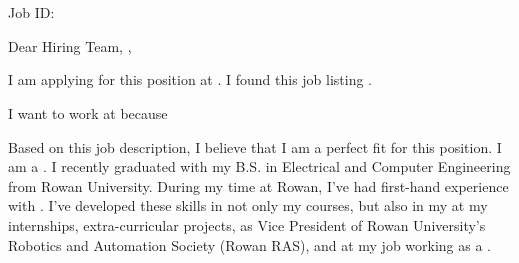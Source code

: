 \documentclass[11pt]{letter} %
\begin{document}
\begin{letter}
    {\companyaddress
    {\ifdefempty{\jobid} {} {\\~\\Job ID: \jobid}}
    }


\opening{
  Dear
\ifdefempty{\companyhiringmanager}
{Hiring Team,}
{\companyhiringmanager,}
}

I am applying for this {\jobterm} {\jobtitle} position at {\company}. I found
    this job listing {\joblisting}.

    I want to work at {\company} because {\iwanttoworkherebecause}

Based on this job description, I believe that I am a perfect fit for this
position. I am a {\personaltag}.
I recently graduated with my B.S. in Electrical and Computer Engineering from
Rowan University. During my time at Rowan, I've had first-hand experience with
{\jobexperience}. I've developed these skills in not only my
courses, but also in my at my internships, extra-curricular projects, as Vice President of
    Rowan University's Robotics and Automation Society (Rowan RAS), and
at my job working as a {\previousjob}.

{\previousjobexperience}

{\deeppassion}



\end{letter}
\end{document}
